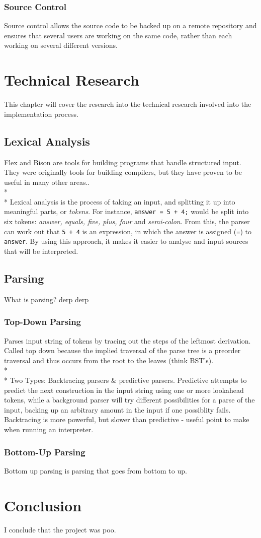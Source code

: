 \documentclass[10pt]{report}
\begin{document}
\subsection{Source Control}\label{subsec:dev_source_control}
Source control allows the source code to be backed up on a remote repository and ensures that several users are working on the same code, rather than each working on several different versions.


\chapter{Technical Research}
This chapter will cover the research into the technical research involved into the implementation process.
\section{Lexical Analysis}\label{sec:lexical_analysis}
Flex and Bison are tools for building programs that handle structured input.  They were originally tools for building compilers, but they have proven to be useful in many other areas.\citep{flexandbison09}.
\\*
\\*
Lexical analysis is the process of taking an input, and splitting it up into meaningful parts, or \textit{tokens}.  For instance, \texttt{answer = 5 + 4;} would be split into six tokens: \textit{answer, equals, five, plus, four} and \textit{semi-colon}.  From this, the parser can work out that \texttt{5 + 4} is an expression, in which the answer is assigned (\texttt{=}) to \texttt{answer}.  By using this approach, it makes it easier to analyse and input sources that will be interpreted.
\section{Parsing}\label{sec:parsing}
What is parsing? derp derp
\subsection{Top-Down Parsing}\label{subsec:top_down_parsing}
Parses input string of tokens by tracing out the steps of the leftmost derivation.  Called top down because the implied traversal of the parse tree is a preorder traversal and thus occurs from the root to the leaves (think BST's).
\\*
\\*
Two Types: Backtracing parsers \& predictive parsers.
Predictive attempts to predict the next construction in the input string using one or more lookahead tokens, while a background parser will try different possibilities for a parse of the input, backing up an arbitrary amount in the input if one possiblity fails.  Backtracing is more powerful, but slower than predictive - useful point to make when running an interpreter.\citep{compilerconstruction97}
\subsection{Bottom-Up Parsing}\label{subsec:bottom_up_parsing}
Bottom up parsing is parsing that goes from bottom to up.

\chapter{Conclusion}
I conclude that the project was poo.



\end{document}
